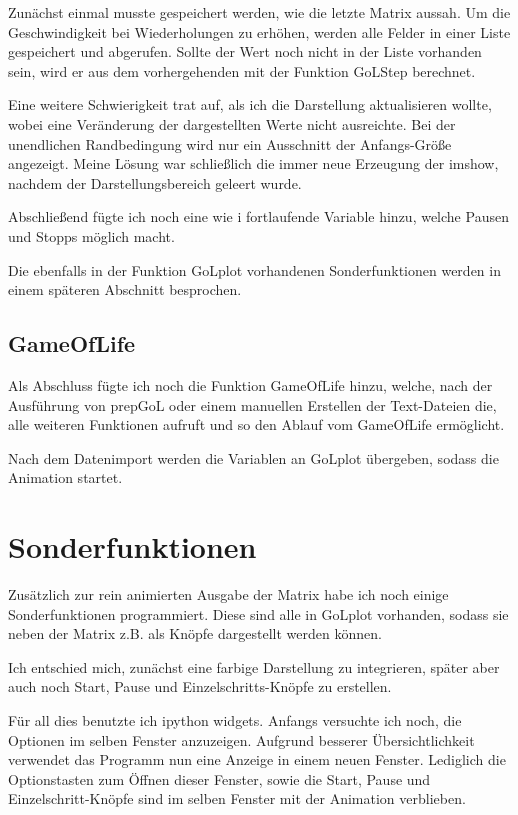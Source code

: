 \documentclass{scrartcl}
\begin{document}
Zunächst einmal musste gespeichert werden, wie die letzte  Matrix aussah. Um die Geschwindigkeit bei Wiederholungen zu erhöhen, werden alle Felder in einer Liste gespeichert und abgerufen. Sollte der Wert noch nicht in der Liste vorhanden sein, wird er aus dem vorhergehenden mit der Funktion GoLStep berechnet.

Eine weitere Schwierigkeit trat auf, als ich die Darstellung aktualisieren wollte, wobei eine Veränderung der dargestellten Werte nicht ausreichte. Bei der unendlichen Randbedingung wird nur ein Ausschnitt der Anfangs-Größe angezeigt. Meine Lösung war schließlich die immer neue Erzeugung der imshow, nachdem der Darstellungsbereich geleert wurde.

Abschließend fügte ich noch eine wie i fortlaufende Variable hinzu, welche Pausen und Stopps möglich macht.

Die ebenfalls in der Funktion GoLplot vorhandenen Sonderfunktionen werden in einem späteren Abschnitt besprochen.

\subsection{GameOfLife}
Als Abschluss fügte ich noch die Funktion GameOfLife hinzu, welche, nach der Ausführung von prepGoL oder einem manuellen Erstellen der Text-Dateien die, alle weiteren Funktionen aufruft und so den Ablauf vom GameOfLife ermöglicht.

Nach dem Datenimport werden die Variablen an GoLplot übergeben, sodass die Animation startet.

\section{Sonderfunktionen}
Zusätzlich zur rein animierten Ausgabe der Matrix habe ich noch einige Sonderfunktionen programmiert. Diese sind alle in GoLplot vorhanden, sodass sie neben der Matrix z.B. als Knöpfe dargestellt werden können.

Ich entschied mich, zunächst eine farbige Darstellung zu integrieren, später aber auch noch Start, Pause und Einzelschritts-Knöpfe zu erstellen. %

Für all dies benutzte ich ipython widgets.
Anfangs versuchte ich noch, die Optionen im selben Fenster anzuzeigen. Aufgrund besserer Übersichtlichkeit verwendet das Programm nun eine Anzeige in einem neuen Fenster. Lediglich die Optionstasten zum Öffnen dieser Fenster, sowie die Start, Pause und Einzelschritt-Knöpfe sind im selben Fenster mit der Animation verblieben.
\end{document}
